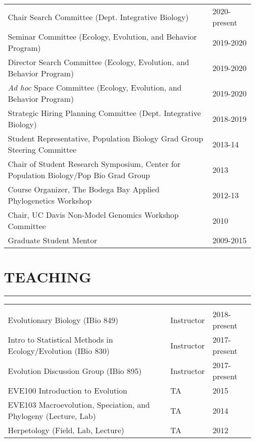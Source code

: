 \documentclass{article}
\begin{document}
\begin{tabular}{>{\everypar{\hangindent1cm}}p{}p{}}
%
Chair Search Committee (Dept. Integrative Biology) & \hfill 2020-present\\
%
Seminar Committee (Ecology, Evolution, and Behavior Program) & \hfill 2019-2020\\
%
Director Search Committee (Ecology, Evolution, and Behavior Program) & \hfill 2019-2020\\
%
\emph{Ad hoc} Space Committee (Ecology, Evolution, and Behavior Program) & \hfill 2019-2020\\
%
Strategic Hiring Planning Committee (Dept. Integrative Biology) & \hfill 2018-2019\\
%
%
Student Representative, Population Biology Grad Group Steering Committee & \hfill 2013-14\\
%
Chair of Student Research Symposium, Center for Population Biology/Pop Bio Grad Group & \hfill 2013\\
%
Course Organizer, The Bodega Bay Applied Phylogenetics Workshop & \hfill 2012-13\\
%
Chair, UC Davis Non-Model Genomics Workshop Committee & \hfill 2010\\
%
Graduate Student Mentor & \hfill 2009-2015\\
%
\end{tabular}
%
\section*{TEACHING}
\vspace{-0.6cm}
\rule{470pt}{0.4pt}
%
\begin{tabular}{>{\everypar{\hangindent1cm}}p{}p{}p{}}
\hfill\\
Evolutionary Biology (IBio 849) & Instructor & \hfill 2018-present \\
Intro to Statistical Methods in Ecology/Evolution (IBio 830) & Instructor & \hfill 2017-present \\
Evolution Discussion Group (IBio 895) & Instructor & \hfill 2017-present \\
EVE100 Introduction to Evolution & TA & \hfill 2015	\\
EVE103 Macroevolution, Speciation, and Phylogeny (Lecture, Lab) & TA & \hfill 2014 \\
Herpetology (Field, Lab, Lecture) & TA & \hfill 2012\\
\end{tabular}
%
\end{document}
